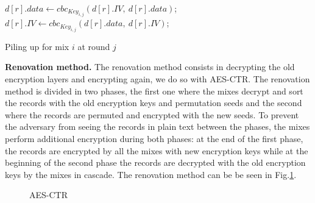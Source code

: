 \documentclass[USenglish,oneside,twocolumn]{article}
\begin{document}
\begin{algorithm}
\DontPrintSemicolon
{}
{
	$d[r].data \gets cbc_{Key_{i,j}}\left( d[r].IV,\ d[r].data \right )$;\\
	$d[r].IV \gets cbc_{Key_{i,j}}\left( d[r].data,\ d[r].IV \right )$;\\
}
\caption{Piling up for mix $i$ at round $j$}
\label{alg:pile}
\end{algorithm}

\textbf{Renovation method.} The renovation method consists in decrypting the old encryption layers and encrypting again, we do so with AES-CTR. 
The renovation method is divided in two phases, the first one where the mixes decrypt and sort the records with the old encryption keys and permutation seeds and the second where the records are permuted and encrypted with the new seeds.
To prevent the adversary from seeing the records in plain text between the phases, the mixes perform additional encryption during both phases: at the end of the first phase, the records are encrypted by all the mixes with new encryption keys while at the beginning of the second phase the records are decrypted with the old encryption keys by the mixes in cascade.
The renovation method can be be seen in Fig.\ref{fig:AES}.  

\begin{figure}[h]
\begin{minipage}{0.475\textwidth}
\begin{adjustbox}{width=\textwidth}
\end{adjustbox}
\centering
\caption{AES-CTR} \label{fig:AES}
\end{minipage}
\end{figure}
\end{document}
